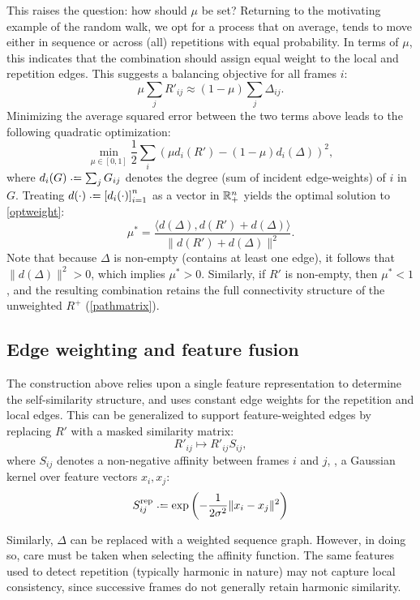 \documentclass{article}
\begin{document}
This raises the question: how should $\mu$ be set?  Returning to the motivating
example of the random walk, we opt for a process that on average, tends to
move either in sequence or across (all) repetitions with equal probability.  In terms of
$\mu$, this indicates that the combination should assign equal weight to the local and
repetition edges.
This suggests a balancing objective for all frames $i$:
$$
\mu \sum_j R'_{ij} \approx (1-\mu) \sum_j \Delta_{ij}.
$$
Minimizing the average squared error between the two terms above leads to the
following quadratic optimization:
\begin{equation}
\min_{\mu \in [0, 1]} \frac{1}{2} \sum_i {(\mu d_i(R') - (1 - \mu)d_i(\Delta))}^2,\label{optweight}
\end{equation}
where $d_i(G) \defeq \sum_j G_{ij}$ denotes the degree (sum of incident edge-weights) 
of $i$ in $G$. Treating $d(\cdot) \defeq {[d_i(\cdot)]}_{i=1}^n$ as a vector in 
$\mathbb{R}^n_+$ yields the optimal solution to \cref{optweight}:
\begin{equation}
\mu^* = \frac{\langle d(\Delta), d(R') + d(\Delta)\rangle}{\|d(R') +
d(\Delta)\|^2}.\label{optweight:solution}
\end{equation}
Note that because $\Delta$ is non-empty (contains at least one edge), it follows that $\|d(\Delta)\|^2 > 0$,
which implies $\mu^* > 0$. Similarly, if $R'$ is non-empty, then $\mu^* < 1$, and the resulting combination 
retains the full connectivity structure of the unweighted $R^+$ (\cref{pathmatrix}).

\subsection{Edge weighting and feature fusion}
The construction above relies upon a single feature representation to 
determine the self-similarity structure, and uses constant edge weights for the
repetition and local edges.  This can be generalized to support
feature-weighted edges by replacing $R'$ with a masked similarity matrix:
\begin{equation}
R'_{ij} \mapsto R'_{ij} S_{ij},
\end{equation}
where $S_{ij}$ denotes a non-negative affinity between frames $i$ and $j$, \eg,
a Gaussian kernel over feature vectors $x_i, x_j$:
\[
S^\text{rep}_{ij} \defeq \exp\left(-\frac{1}{2\sigma^2}\|x_i - x_j\|^2\right)
\]

Similarly, $\Delta$ can be replaced with a weighted sequence graph.  However, in doing so,
care must be taken when selecting the affinity function.  The same features used to detect 
repetition (typically harmonic in nature) may not capture local consistency, since 
successive frames do not generally retain harmonic similarity.  
\end{document}
